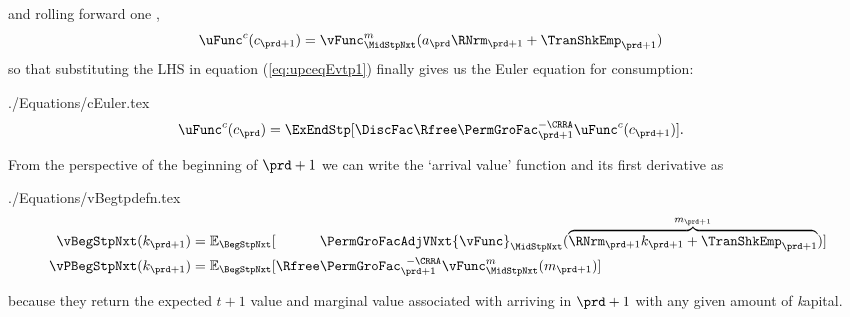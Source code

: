 \documentclass[SolvingMicroDSOPs]{subfiles}
\begin{document}
\unskip
and rolling forward one {\interval},
\begin{equation}\begin{gathered}\begin{aligned}
      \uFunc^{{c}}({c}_{\prd+1})  & = {\vFunc}^{{m}}_{\MidStpNxt}({a}_{\prd}\RNrm_{\prd+1}+\TranShkEmp_{\prd+1}) \label{eq:upctp1EqVpxtp1}
    \end{aligned}\end{gathered}\end{equation}
so that substituting the LHS in equation (\ref{eq:upceqEvtp1}) finally gives us the Euler equation for consumption:
\begin{verbatimwrite}{./Equations/cEuler.tex}
  \begin{equation}\begin{gathered}\begin{aligned}
        \uFunc^{{c}}({c}_{\prd})  & = \ExEndStp[\DiscFac\Rfree \PermGroFac_{\prd+1}^{-\CRRA}\uFunc^{{c}}({c}_{\prd+1})] \label{eq:cEuler}.
      \end{aligned}\end{gathered}\end{equation}
\end{verbatimwrite}
\unskip

From the perspective of the beginning of {\interval} $\prd+1$ we can write the `arrival value' function and its first derivative as
\begin{verbatimwrite}{./Equations/vBegtpdefn.tex}
  \begin{equation}\begin{gathered}\begin{aligned}
        \vBegStpNxt({k}_{\prd+1})    & = \Ex_{\BegStpNxt}[\phantom{\Rfree}\PermGroFacAdjVNxt{\vFunc}_{\MidStpNxt}(\overbrace{\RNrm_{\prd+1}{k}_{\prd+1}+{\TranShkEmp}_{\prd+1}}^{{m}_{\prd+1}})] \label{eq:vFuncBegtpdefn} \\
        {\vPBegStpNxt}({k}_{\prd+1}) & = \Ex_{\BegStpNxt}[\Rfree \PermGroFac_{\prd+1}^{\phantom{1}-\CRRA} {\vFunc}_{\MidStpNxt}^{{m}}({m}_{\prd+1})]
      \end{aligned}\end{gathered}\end{equation}
\end{verbatimwrite}\unskip
\unskip
because they return the expected $t+1$ value and marginal value associated with arriving in {\interval} $\prd+1$ with any given amount of \textit{k}apital.
\end{document}
